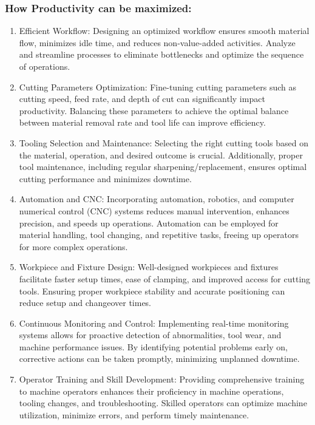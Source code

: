 \documentclass{article}
\begin{document}
\subsubsection*{How Productivity can be maximized:}
\begin{enumerate}
  \item Efficient Workflow: Designing an optimized workflow ensures smooth material flow, minimizes idle time, and reduces non-value-added activities. Analyze and streamline processes to eliminate bottlenecks and optimize the sequence of operations.

\item Cutting Parameters Optimization: Fine-tuning cutting parameters such as cutting speed, feed rate, and depth of cut can significantly impact productivity. Balancing these parameters to achieve the optimal balance between material removal rate and tool life can improve efficiency.

\item Tooling Selection and Maintenance: Selecting the right cutting tools based on the material, operation, and desired outcome is crucial. Additionally, proper tool maintenance, including regular sharpening/replacement, ensures optimal cutting performance and minimizes downtime.

\item Automation and CNC: Incorporating automation, robotics, and computer numerical control (CNC) systems reduces manual intervention, enhances precision, and speeds up operations. Automation can be employed for material handling, tool changing, and repetitive tasks, freeing up operators for more complex operations.

\item Workpiece and Fixture Design: Well-designed workpieces and fixtures facilitate faster setup times, ease of clamping, and improved access for cutting tools. Ensuring proper workpiece stability and accurate positioning can reduce setup and changeover times.

\item Continuous Monitoring and Control: Implementing real-time monitoring systems allows for proactive detection of abnormalities, tool wear, and machine performance issues. By identifying potential problems early on, corrective actions can be taken promptly, minimizing unplanned downtime.

\item Operator Training and Skill Development: Providing comprehensive training to machine operators enhances their proficiency in machine operations, tooling changes, and troubleshooting. Skilled operators can optimize machine utilization, minimize errors, and perform timely maintenance.


\end{enumerate}
\end{document}
